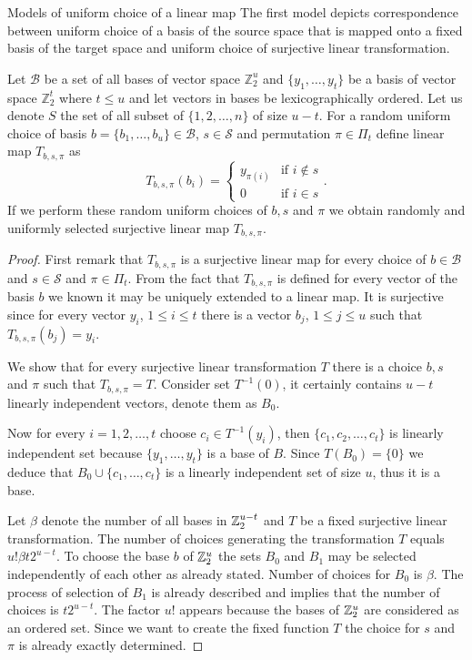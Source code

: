 \begin{section}{Models of uniform choice of a linear map}
The first model depicts correspondence between uniform choice of a basis of the source space that is mapped onto a fixed basis of the target space and uniform choice of surjective linear transformation.
\begin{remark}
\label{remark-model-surjective-linear-map-selection}
Let $\mathcal{B}$ be a set of all bases of vector space $\mathbb{Z}_2^u$ and $\{y_1, \dots, y_t\}$ be a basis of vector space $\mathbb{Z}_2^t$ where $t \leq u$ and let vectors in bases be lexicographically ordered. Let us denote $S$ the set of all subset of $\{1, 2, \dots, n\}$ of size $u - t$. For a random uniform choice of basis $b = \{b_1, \dots, b_u\} \in \mathcal{B}$, $s \in \mathcal{S}$ and permutation $\pi \in \Pi_t$ define linear map $T_{b, s, \pi}$ as
\[
T_{b, s, \pi}(b_i) =  
  \begin{cases} 
    y_{\pi(i)} & \text{if } i \notin s \\
    0 & \text{if } i \in s
  \end{cases} \text{.}
\]
If we perform these random uniform choices of $b, s$ and $\pi$ we obtain randomly and uniformly selected surjective linear map $T_{b, s, \pi}$.
\end{remark}
\begin{proof}
First remark that $T_{b, s, \pi}$ is a surjective linear map for every choice of $b \in \mathcal{B}$ and $s \in \mathcal{S}$ and $\pi \in \Pi_t$. From the fact that $T_{b, s, \pi}$ is defined for every vector of the basis $b$ we known it may be uniquely extended to a linear map. It is surjective since for every vector $y_i$, $1 \leq i \leq t$ there is a vector $b_j$, $1 \leq j \leq u$ such that $T_{b, s, \pi}(b_j) = y_i$. 

We show that for every surjective linear transformation $T$ there is a choice $b, s$ and $\pi$ such that $T_{b, s, \pi} = T$. Consider set $T^{-1}(0)$, it certainly contains $u - t$ linearly independent vectors, denote them as $B_0$. 

Now for every $i = 1, 2, \dots, t$ choose $c_i \in T^{-1}(y_i)$, then $\{c_1, c_2, \dots, c_t\}$ is linearly independent set because $\{y_1, \dots, y_t\}$ is a base of $B$. Since $T(B_0) = \{ 0 \}$ we deduce that $B_0 \cup \{ c_1, \dots, c_t \}$ is a linearly independent set of size $u$, thus it is a base.

Let $\beta$ denote the number of all bases in $\mathbb{Z}_{2}^{u - t}$ and $T$ be a fixed surjective linear transformation. The number of choices generating the transformation $T$ equals $u! \beta t 2 ^ {u - t}$. To choose the base $b$ of $\mathbb{Z}_{2}^{u}$ the sets $B_0$ and $B_1$ may be selected independently of each other as already stated. Number of choices for $B_0$ is $\beta$. The process of selection of $B_1$ is already described and implies that the number of choices is $t 2 ^ {u - t}$. The factor $u!$ appears because the bases of $\mathbb{Z}_{2}^{u}$ are considered as an ordered set. Since we want to create the fixed function $T$ the choice for $s$ and $\pi$ is already exactly determined. 
\end{proof}


\end{section}
